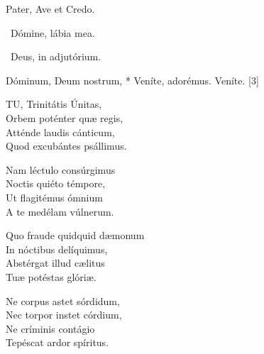 

Pater, Ave et Credo.

\V\ Dómine, lábia mea.

\V\ Deus, in adjutórium.


 Dóminum, Deum nostrum, * Veníte, adorémus.  Veníte. [3]


\lettrine[lines=2]{T}{U}, Trinitátis Únitas,\\
Orbem poténter quæ regis,\\
Atténde laudis cánticum,\\
Quod excubántes psállimus.

Nam léctulo consúrgimus\\
Noctis quiéto témpore,\\
Ut flagitémus ómnium\\
A te medélam vúlnerum.

Quo fraude quidquid dæmonum\\
In nóctibus delíquimus,\\
Abstérgat illud cælitus\\
Tuæ potéstas glóriæ.

Ne corpus astet sórdidum,\\
Nec torpor instet córdium,\\
Ne críminis contágio\\
Tepéscat ardor spíritus.


